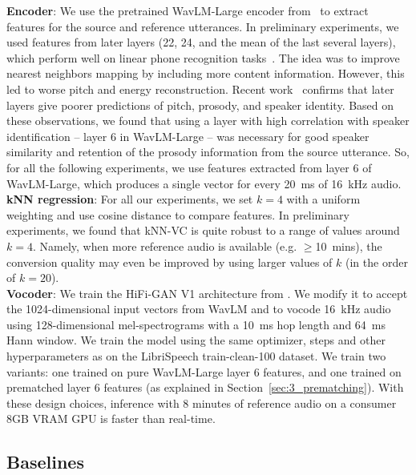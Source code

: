 \documentclass{INTERSPEECH2023}
\def\modelname{{kNN-VC}}
\begin{document}
\textbf{Encoder}: We use the pretrained WavLM-Large encoder from~\cite{chen2022wavlm} to extract features for the source and reference utterances.
In preliminary experiments, we used features from later layers (22, 24, and the mean of the last several layers), which perform well on linear phone recognition tasks~\cite{chen2022wavlm}.
The idea was to improve nearest neighbors mapping by including more content information.
However, this led to worse pitch and energy reconstruction.
Recent work~\cite{wavlm_prosody_weights2023} confirms that later layers
give poorer predictions of pitch, prosody, and speaker identity. Based on these observations, we found that using a layer with high correlation with speaker identification -- layer 6 in WavLM-Large -- was necessary for good speaker similarity and retention of the prosody information from the source utterance.
So, for all the following experiments, we use features extracted from layer 6 of WavLM-Large, which produces a single vector for every 20~ms of 16~kHz audio.\\

\noindent \textbf{kNN regression}: 
For all our experiments, we set $k=4$ with a uniform weighting and use cosine distance to compare features.
In preliminary experiments, we found that \modelname{} is quite robust to a range of values around $k=4$. 
Namely, when more reference audio is available (e.g. $\geq$10~mins), the conversion quality may even be improved by using larger values of $k$ (in the order of $k=20$). \\

\noindent \textbf{Vocoder}: We train the HiFi-GAN V1 architecture from \cite{hifi-gan}.
We modify it
to accept the 1024-dimensional input vectors from WavLM and to vocode 16~kHz audio using 128-dimensional mel-spectrograms
with a 10~ms hop length and 64~ms Hann window.
We train the model using the same optimizer, steps and other hyperparameters as \cite{hifi-gan} on the LibriSpeech train-clean-100 dataset.
We train two
variants: one trained on pure WavLM-Large layer 6 features, and one trained on prematched layer 6 features (as explained in Section~\ref{sec:3_prematching}).
With these design choices, inference with 8 minutes of reference audio on a consumer 8GB VRAM GPU is faster than real-time.

\subsection{Baselines}
\end{document}
